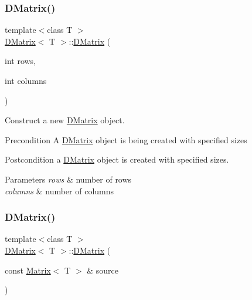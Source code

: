\subsubsection{\texorpdfstring{DMatrix()}{DMatrix()}\hspace{0.1cm}{\footnotesize\ttfamily [2/5]}}
{\footnotesize\ttfamily template$<$class T $>$ \\
\mbox{\hyperlink{class_d_matrix}{D\+Matrix}}$<$ T $>$\+::\mbox{\hyperlink{class_d_matrix}{D\+Matrix}} (\begin{DoxyParamCaption}\item[{int}]{rows,  }\item[{int}]{columns }\end{DoxyParamCaption})}



Construct a new \mbox{\hyperlink{class_d_matrix}{D\+Matrix}} object. 

\begin{DoxyPrecond}{Precondition}
A \mbox{\hyperlink{class_d_matrix}{D\+Matrix}} object is being created with specified sizes 
\end{DoxyPrecond}
\begin{DoxyPostcond}{Postcondition}
a \mbox{\hyperlink{class_d_matrix}{D\+Matrix}} object is created with specified sizes.
\end{DoxyPostcond}

\begin{DoxyParams}{Parameters}
{\em rows} & number of rows \\
\hline
{\em columns} & number of columns \\
\hline
\end{DoxyParams}
\mbox{\label{class_d_matrix_a87bb9bff38ff9c1fd207bd84d8068455}} 
\subsubsection{\texorpdfstring{DMatrix()}{DMatrix()}\hspace{0.1cm}{\footnotesize\ttfamily [3/5]}}
{\footnotesize\ttfamily template$<$class T $>$ \\
\mbox{\hyperlink{class_d_matrix}{D\+Matrix}}$<$ T $>$\+::\mbox{\hyperlink{class_d_matrix}{D\+Matrix}} (\begin{DoxyParamCaption}\item[{const \mbox{\hyperlink{class_matrix}{Matrix}}$<$ T $>$ \&}]{source }\end{DoxyParamCaption})}



